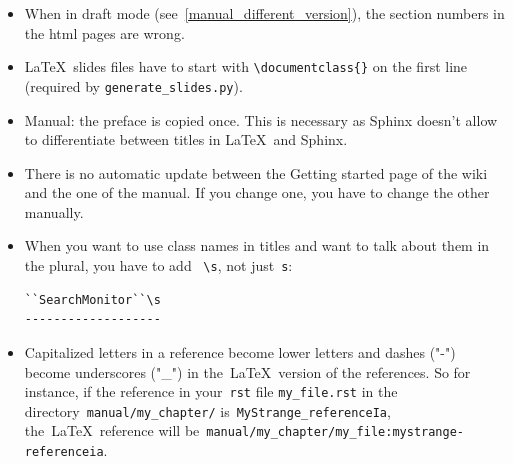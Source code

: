 \documentclass[a4paper,10pt]{article}
\newcommand{\code}[1]{\texttt{#1}}
\begin{document}
\begin{itemize}
 \item When in draft mode (see~\ref{manual_different_version}), the section numbers in the html pages are wrong. 
 \item \LaTeX\ slides files have to start with \code{\textbackslash documentclass\{\}} on the first line (required by \code{generate\_slides.py}).
 \item Manual: the preface is copied once. This is necessary as Sphinx doesn't allow to differentiate between titles in \LaTeX\ and Sphinx.
 \item There is no automatic update between the Getting started page of the wiki and the one of the manual. If you change one, you have to change the other manually. 
 \item When you want to use class names in titles and want to talk about them in the plural, you have to add ~\verb+\s+, not just~\verb+s+:
  \begin{verbatim}
``SearchMonitor``\s
-------------------
  \end{verbatim}

  \item Capitalized letters in a reference become lower letters and dashes ("-") become underscores ("\_") in the~\LaTeX\ version of the references. So for instance, if the reference in your~\code{rst} file \code{my\_file.rst} in the directory~\code{manual/my\_chapter/} is~\code{MyStrange\_referenceIa}, the~\LaTeX~reference will be~\code{manual/my\_chapter/my\_file:mystrange-referenceia}. 
\end{itemize}
\end{document}
